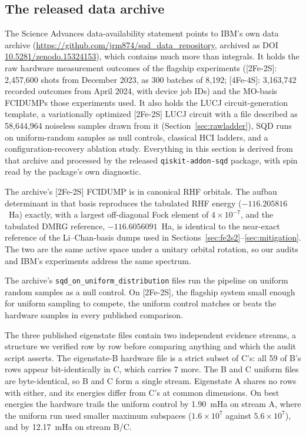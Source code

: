\documentclass[11pt]{article}
\begin{document}
\subsection{The released data archive}\label{sec:archive}

The Science Advances data-availability statement points to IBM's own data archive (\url{https://github.com/jrm874/sqd_data_repository}, archived as DOI \href{https://doi.org/10.5281/zenodo.15324153}{10.5281/zenodo.15324153}), which contains much more than integrals. It holds the raw hardware measurement outcomes of the flagship experiments ([2Fe-2S]: 2{,}457{,}600 shots from December 2023, as 300 batches of 8{,}192; [4Fe-4S]: 3{,}163{,}742 recorded outcomes from April 2024, with device job IDs) and the MO-basis FCIDUMPs those experiments used. It also holds the LUCJ circuit-generation template, a variationally optimized [2Fe-2S] LUCJ circuit with a file described as 58{,}644{,}964 noiseless samples drawn from it (Section~\ref{sec:rawladder}), SQD runs on uniform-random samples as null controls, classical HCI ladders, and a configuration-recovery ablation study. Everything in this section is derived from that archive and processed by the released \texttt{qiskit-addon-sqd} package, with spin read by the package's own diagnostic.

The archive's [2Fe-2S] FCIDUMP is in canonical RHF orbitals. The aufbau determinant in that basis reproduces the tabulated RHF energy ($-116.205816$~Ha) exactly, with a largest off-diagonal Fock element of $4\times10^{-7}$, and the tabulated DMRG reference, $-116.6056091$~Ha, is identical to the near-exact reference of the Li--Chan-basis dumps used in Sections~\ref{sec:fe2s2}--\ref{sec:mitigation}. The two are the same active space under a unitary orbital rotation, so our audits and IBM's experiments address the same spectrum.

The archive's \texttt{sqd\_on\_uniform\_distribution} files run the pipeline on uniform random samples as a null control. On [2Fe-2S], the flagship system small enough for uniform sampling to compete, the uniform control matches or beats the hardware samples in every published comparison.

The three published eigenstate files contain two independent evidence streams, a structure we verified row by row before comparing anything and which the audit script asserts. The eigenstate-B hardware file is a strict subset of C's: all 59 of B's rows appear bit-identically in C, which carries 7 more. The B and C uniform files are byte-identical, so B and C form a single stream. Eigenstate A shares no rows with either, and its energies differ from C's at common dimensions. On best energies the hardware trails the uniform control by 1.90~mHa on stream A, where the uniform run used smaller maximum subspaces ($1.6\times10^7$ against $5.6\times10^7$), and by 12.17~mHa on stream B/C.
\end{document}
